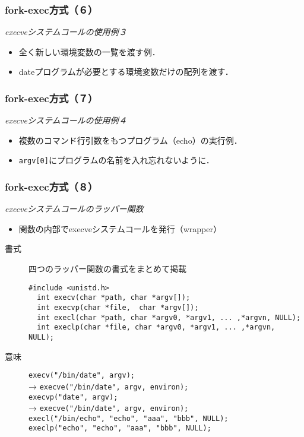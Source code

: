 \documentclass{beamer}                 %
\begin{document}
\begin{frame}[fragile]
  \frametitle{fork-exec方式（６）}
  \emph{execveシステムコールの使用例３} \\
  \begin{itemize}
  \item 全く新しい環境変数の一覧を渡す例．
  \item dateプログラムが必要とする環境変数だけの配列を渡す．
  \end{itemize}
  \vfill
\end{frame}

\begin{frame}[fragile]
  \frametitle{fork-exec方式（７）}
  \emph{execveシステムコールの使用例４} \\
  \begin{itemize}
  \item 複数のコマンド行引数をもつプログラム（echo）の実行例．
  \item \texttt{argv[0]}にプログラムの名前を入れ忘れないように．
  \end{itemize}
  \vfill
\end{frame}

\begin{frame}[fragile]
  \frametitle{fork-exec方式（８）}
  \emph{execveシステムコールのラッパー関数} \\
  \begin{itemize}
  \item 関数の内部でexecveシステムコールを発行（wrapper）
  \end{itemize}
  \begin{description}
  \item[書式] 四つのラッパー関数の書式をまとめて掲載
\begin{lstlisting}[numbers=none]
  #include <unistd.h>
  int execv(char *path, char *argv[]);
  int execvp(char *file,  char *argv[]);
  int execl(char *path, char *argv0, *argv1, ... ,*argvn, NULL);
  int execlp(char *file, char *argv0, *argv1, ... ,*argvn, NULL);
\end{lstlisting}
  \item[意味] \texttt{execv("/bin/date", argv);} \\
    →  \texttt{execve("/bin/date", argv, environ);} \\
    \texttt{execvp("date", argv);} \\
    →  \texttt{execve("/bin/date", argv, environ);} \\
    \texttt{execl("/bin/echo", "echo", "aaa", "bbb", NULL);} \\
    \texttt{execlp("echo", "echo", "aaa", "bbb", NULL);} \\
  \end{description}
  \vfill
\end{frame}
\end{document}
